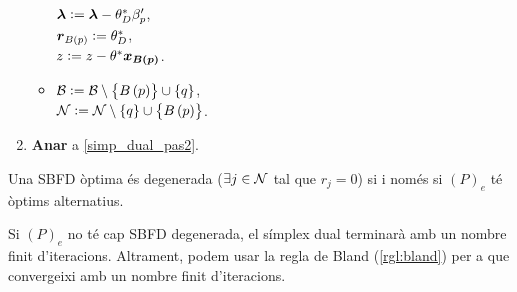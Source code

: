\begin{alg}
\begin{enumerate}
\begin{itemize}
                    $\boldsymbol{\lambda} := \boldsymbol{\lambda} - \theta_D^* \beta_p^\prime$, \\
                    $\boldsymbol{r}_{B\left(p\right)} := \theta_D^*$, \\
                    $z := z - \theta^* \boldsymbol{x_{B\left(p\right)}}$.
                \item $\mathcal{B} := \mathcal{B} \setminus \left\{B\left(p\right)\right\} \cup \left\{q\right\}$, \\
                    $\mathcal{N} := \mathcal{N} \setminus \left\{q\right\} \cup \left\{B\left(p\right)\right\}$.
            \end{itemize}
        \item {\bf Anar} a \ref{simp_dual_pas2}.
    \end{enumerate}
\end{alg}

\begin{prop}
    Una SBFD òptima és degenerada ($\exists j \in \mathcal{N}$ tal que $r_j = 0$) si i només si $\left(P\right)_e$ té òptims alternatius.
\end{prop}

\begin{prop}
    Si $\left(P\right)_e$ no té cap SBFD degenerada, el símplex dual terminarà amb un nombre finit d'iteracions. Altrament, podem usar la regla de Bland (\ref{rgl:bland}) per a que convergeixi amb un nombre finit d'iteracions.
\end{prop}